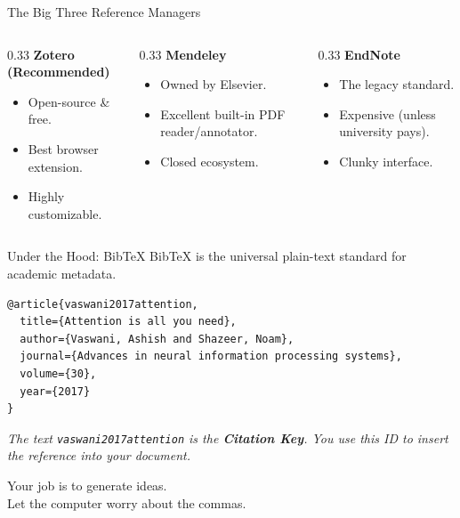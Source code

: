 \documentclass[aspectratio=169]{beamer}
\begin{document}
\begin{frame}{The Big Three Reference Managers}
  \begin{columns}[T]
    \begin{column}{0.33\textwidth}
      \textbf{Zotero (Recommended)}
      \begin{itemize}
        \item Open-source \& free.
        \item Best browser extension.
        \item Highly customizable.
      \end{itemize}
    \end{column}
    \begin{column}{0.33\textwidth}
      \textbf{Mendeley}
      \begin{itemize}
        \item Owned by Elsevier.
        \item Excellent built-in PDF reader/annotator.
        \item Closed ecosystem.
      \end{itemize}
    \end{column}
    \begin{column}{0.33\textwidth}
      \textbf{EndNote}
      \begin{itemize}
        \item The legacy standard.
        \item Expensive (unless university pays).
        \item Clunky interface.
      \end{itemize}
    \end{column}
  \end{columns}
\end{frame}

\begin{frame}[fragile]{Under the Hood: BibTeX}
  BibTeX is the universal plain-text standard for academic metadata.
  
\begin{verbatim}
@article{vaswani2017attention,
  title={Attention is all you need},
  author={Vaswani, Ashish and Shazeer, Noam},
  journal={Advances in neural information processing systems},
  volume={30},
  year={2017}
}
\end{verbatim}

  \textit{The text \texttt{vaswani2017attention} is the \textbf{Citation Key}. You use this ID to insert the reference into your document.}
\end{frame}

\begin{frame}[standout]
  Your job is to generate ideas.\\
  Let the computer worry about the commas.
\end{frame}
\end{document}
